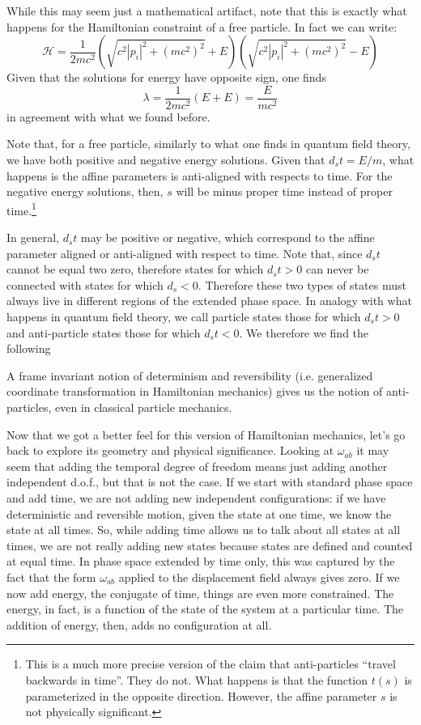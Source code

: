 While this may seem just a mathematical artifact, note that this is exactly what happens for the Hamiltonian constraint of a free particle. In fact we can write:
\begin{equation}
	\mathcal{H} = \frac{1}{2mc^2} (\sqrt{c^2 |p_i|^2 + (mc^2)^2 } + E) (\sqrt{c^2 |p_i|^2 + (mc^2)^2 } - E)
\end{equation}
Given that the solutions for energy have opposite sign, one finds
\begin{equation}
	\lambda = \frac{1}{2mc^2}(E + E) = \frac{E}{mc^2}
\end{equation}
in agreement with what we found before.

Note that, for a free particle, similarly to what one finds in quantum field theory, we have both positive and negative energy solutions. Given that $d_s t = E/m$, what happens is the affine parameters is anti-aligned with respects to time. For the negative energy solutions, then, $s$ will be minus proper time instead of proper time.\footnote{This is a much more precise version of the claim that anti-particles ``travel backwards in time''. They do not. What happens is that the function $t(s)$ is parameterized in the opposite direction. However, the affine parameter $s$ is not physically significant.}

In general, $d_s t$ may be positive or negative, which correspond to the affine parameter aligned or anti-aligned with respect to time. Note that, since $d_s t$ cannot be equal two zero, therefore states for which $d_s t > 0$ can never be connected with states for which $d_s < 0$. Therefore these two types of states must always live in different regions of the extended phase space. In analogy with what happens in quantum field theory, we call particle states those for which $d_s t > 0$ and anti-particle states those for which $d_s t < 0$. We therefore we find the following
\begin{insight}
	A frame invariant notion of determinism and reversibility (i.e. generalized coordinate transformation in Hamiltonian mechanics) gives us the notion of anti-particles, even in classical particle mechanics.
\end{insight}

Now that we got a better feel for this version of Hamiltonian mechanics, let's go back to explore its geometry and physical significance. Looking at $\omega_{ab}$ it may seem that adding the temporal degree of freedom means just adding another independent d.o.f., but that is not the case. If we start with standard phase space and add time, we are not adding new independent configurations: if we have deterministic and reversible motion, given the state at one time, we know the state at all times. So, while adding time allows us to talk about all states at all times, we are not really adding new states because states are defined and counted at equal time. In phase space extended by time only, this was captured by the fact that the form $\omega_{ab}$ applied to the displacement field always gives zero. If we now add energy, the conjugate of time, things are even more constrained. The energy, in fact, is a function of the state of the system at a particular time. The addition of energy, then, adds no configuration at all.


